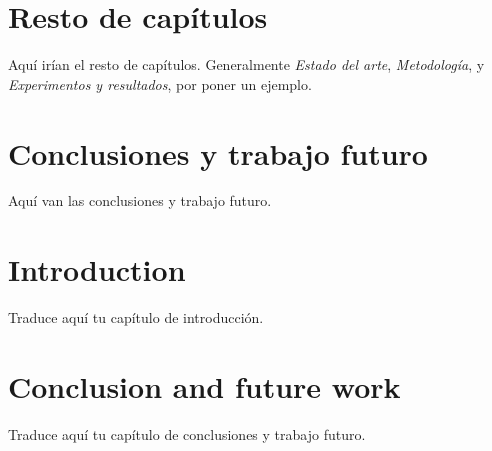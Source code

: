 \documentclass[11pt,a4paper]{book}
\begin{document}
\chapter{Resto de capítulos}
Aquí irían el resto de capítulos. Generalmente \emph{Estado del arte}, \emph{Metodología}, y \emph{Experimentos y resultados}, por poner un ejemplo.

\chapter{Conclusiones y trabajo futuro}
Aquí van las conclusiones y trabajo futuro.

\chapter{Introduction}
Traduce aquí tu capítulo de introducción.

\chapter{Conclusion and future work}
Traduce aquí tu capítulo de conclusiones y trabajo futuro.



\printglossary[type=\acronymtype, title={Acrónimos}]
\end{document}
